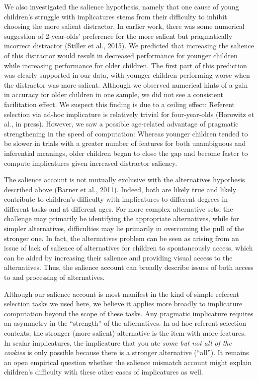 \documentclass[man]{apa6}
\theoremstyle{definition}
\theoremstyle{definition}
\theoremstyle{definition}
\theoremstyle{remark}
\begin{document}
We also investigated the salience hypothesis, namely that one cause of
young children's struggle with implicatures stems from their difficulty
to inhibit choosing the more salient distractor. In earlier work, there
was some numerical suggestion of 2-year-olds' preference for the more
salient but pragmatically incorrect distractor (Stiller et al., 2015).
We predicted that increasing the salience of this distractor would
result in decreased performance for younger children while increasing
performance for older children. The first part of this prediction was
clearly supported in our data, with younger children performing worse
when the distractor was more salient. Although we observed numerical
hints of a gain in accuracy for older children in one sample, we did not
see a consistent facilitation effect. We suspect this finding is due to
a ceiling effect: Referent selection via ad-hoc implicature is
relatively trivial for four-year-olds (Horowitz et al., in press).
However, we saw a possible age-related advantage of pragmatic
strengthening in the speed of computation: Whereas younger children
tended to be slower in trials with a greater number of features for both
unambiguous and inferential meanings, older children began to close the
gap and become faster to compute implicatures given increased distractor
saliency.

The salience account is not mutually exclusive with the alternatives
hypothesis described above (Barner et al., 2011). Indeed, both are
likely true and likely contribute to children's difficulty with
implicatures to different degrees in different tasks and at different
ages. For more complex alternative sets, the challenge may primarily be
identifying the appropriate alternatives, while for simpler
alternatives, difficulties may lie primarily in overcoming the pull of
the stronger one. In fact, the alternatives problem can be seen as
arising from an issue of lack of salience of alternatives for children
to spontaneously access, which can be aided by increasing their salience
and providing visual access to the alternatives. Thus, the salience
account can broadly describe issues of both access to and processing of
alternatives.

Although our salience account is most manifest in the kind of simple
referent selection tasks we used here, we believe it applies more
broadly to implicature computation beyond the scope of these tasks. Any
pragmatic implicature requires an asymmetry in the \enquote{strength} of
the alternatives. In ad-hoc referent-selection contexts, the stronger
(more salient) alternative is the item with more features. In scalar
implicatures, the implicature that you ate \emph{some but not all of the
cookies} is only possible because there is a stronger alternative
(\enquote{all}). It remains an open empirical question whether the
salience mismatch account might explain children's difficulty with these
other cases of implicatures as well.
\end{document}
